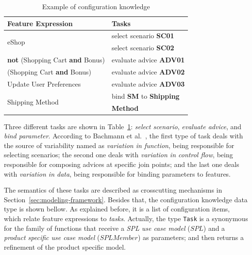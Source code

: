 \documentclass{sig-alternate}
\begin{document}
\begin{table}[htb]
\begin{small}
\begin{tabular}{|lp{1.4in}|}
\hline
Feature Expression  						& Tasks					 \\ \hline \hline

\multirow{2}{*}{eShop}						& select scenario {\bf SC01} \\
											& select scenario {\bf SC02} \\	 \hline
{\bf not} (Shopping Cart {\bf and} Bonus) 	& evaluate advice {\bf ADV01} \\ \hline 
(Shopping Cart {\bf and} Bonus) 		& evaluate advice {\bf ADV02} 	\\   \hline
Update User Preferences 				& evaluate advice {\bf ADV03} \\     \hline 
\multirow{2}{*}{Shipping Method}		& bind {\bf SM} to {\bf Shipping} \\  
										& {\bf Method}\\ \hline
								
\end{tabular}
\end{small}
\caption{Example of configuration knowledge}
\label{tab:eshop-ck}
\end{table}

Three different tasks are shown
in Table~\ref{tab:eshop-ck}: \emph{select scenario}, \emph{evaluate advice}, and
\emph{bind parameter}. According to Bachmann et
al.~\cite{Bachmann:2001aa}, the first type of task deals with the source of
variability named as \emph{variation in function}, being responsible for
selecting scenarios; the second one deals with \emph{variation in control flow},
being responsible for composing advices at specific join points; and the last one
deals with \emph{variation in data}, being responsible for binding parameters to
features.

The semantics of these tasks are described as crosscutting mechanisms
in Section~\ref{sec:modeling-framework}. Besides that, the configuration knowledge data type is shown bellow. As explained before, it is a list of configuration items, which relate feature expressions to
\emph{tasks}. Actually, the type \texttt{Task} is a synonymous for the
family of functions that receive a \emph{SPL use case model} ($SPL$) and a \emph{product
specific use case model} ($SPLMember$) as parameters; and then returns a
refinement of the product specific model.
 
\end{document}
